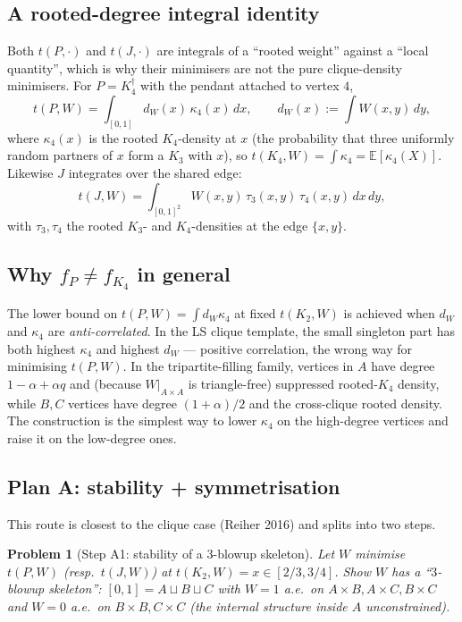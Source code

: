 \documentclass[11pt]{amsart}
\newtheorem{problem}[theorem]{Problem}
\theoremstyle{definition}
\newcommand{\E}{\mathbb E}
\newcommand{\1}{\mathbf 1}
\newcommand{\dd}{\,d}
\begin{document}
\subsection{A rooted-degree integral identity}

Both $t(P,\cdot)$ and $t(J,\cdot)$ are integrals of a ``rooted weight'' against a
``local quantity'', which is why their minimisers are not the pure clique-density
minimisers.  For $P=K_4^\dagger$ with the pendant attached to vertex $4$,
\begin{equation}
\label{eq:P-integral}
   t(P,W) = \int_{[0,1]} d_W(x)\,\kappa_4(x)\dd x,
   \qquad
   d_W(x):=\int W(x,y)\dd y,
\end{equation}
where $\kappa_4(x)$ is the rooted $K_4$-density at $x$ (the probability that
three uniformly random partners of $x$ form a $K_3$ with $x$), so
$t(K_4,W)=\int\kappa_4=\E[\kappa_4(X)]$.  Likewise $J$ integrates over the shared
edge:
\begin{equation}
\label{eq:J-integral}
   t(J,W) = \int_{[0,1]^2} W(x,y)\,\tau_3(x,y)\,\tau_4(x,y)\dd x\dd y,
\end{equation}
with $\tau_3,\tau_4$ the rooted $K_3$- and $K_4$-densities at the edge $\{x,y\}$.

\subsection{Why $f_P\ne f_{K_4}$ in general}

The lower bound on $t(P,W)=\int d_W\kappa_4$ at fixed $t(K_2,W)$ is achieved when
$d_W$ and $\kappa_4$ are \emph{anti-correlated}.  In the LS clique template, the
small singleton part has both highest $\kappa_4$ and highest $d_W$ --- positive
correlation, the wrong way for minimising $t(P,W)$.  In the tripartite-filling
family, vertices in $A$ have degree $1-\alpha+\alpha q$ and (because
$W|_{A\times A}$ is triangle-free) suppressed rooted-$K_4$ density, while $B,C$
vertices have degree $(1+\alpha)/2$ and the cross-clique rooted density.  The
construction is the simplest way to lower $\kappa_4$ on the high-degree vertices
and raise it on the low-degree ones.

\subsection{Plan A: stability + symmetrisation}

This route is closest to the clique case (Reiher 2016) and splits into two steps.

\begin{problem}[Step A1: stability of a $3$-blowup skeleton]
\label{prob:A1}
Let $W$ minimise $t(P,W)$ (resp.\ $t(J,W)$) at $t(K_2,W)=x\in[2/3,3/4]$.  Show
$W$ has a ``$3$-blowup skeleton'': $[0,1]=A\sqcup B\sqcup C$ with $W=1$ a.e.\ on
$A\times B, A\times C, B\times C$ and $W=0$ a.e.\ on $B\times B, C\times C$ (the
internal structure inside $A$ unconstrained).
\end{problem}
\end{document}
